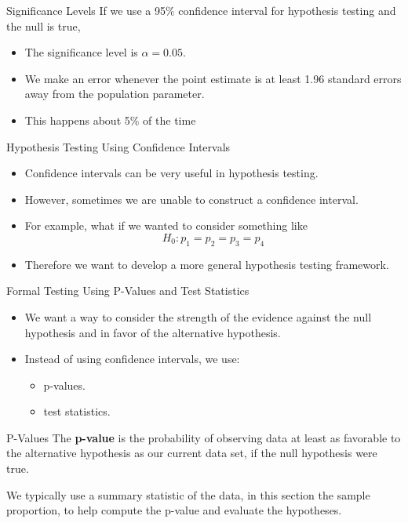\begin{frame}{Significance Levels}
    If we use a 95\% confidence interval for hypothesis testing and the null is true,
    \begin{itemize}
        \item The significance level is $\alpha=0.05$.
        \item We make an error whenever the point estimate is at least 1.96 standard errors away from the population parameter.
        \item This happens about 5\% of the time
    \end{itemize}
\end{frame}

\begin{frame}{Hypothesis Testing Using Confidence Intervals}
    \begin{itemize}
        \item Confidence intervals can be very useful in hypothesis testing.
        \item However, sometimes we are unable to construct a confidence interval.
        \item For example, what if we wanted to consider something like
            \[ H_0: p_1=p_2=p_3=p_4 \]
        \item Therefore we want to develop a more general hypothesis testing framework.
    \end{itemize}
\end{frame}

\begin{frame}{Formal Testing Using P-Values and Test Statistics}
    \begin{itemize}
        \item We want a way to consider the strength of the evidence against the null hypothesis and in favor of the alternative hypothesis. 
        \item Instead of using confidence intervals, we use:
        \begin{itemize}
            \item p-values.
            \item test statistics.
        \end{itemize}
    \end{itemize}
\end{frame}

\begin{frame}{P-Values}
    The \textbf{p-value} is the probability of observing data at least as favorable to the alternative hypothesis as our current data set, if the null hypothesis were true. 
    
    \vspace{12pt}We typically use a summary statistic of the data, in this section the sample proportion, to help compute the p-value and evaluate the hypotheses.
\end{frame}

